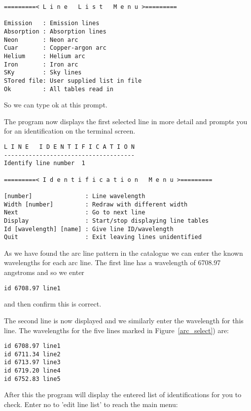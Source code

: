 \documentclass[twoside,11pt]{article}
\newcommand{\scspec}[2]{#1}
\newcommand{\scspec}[2]{#2}
\begin{document}
{\scspec{\small}{ }
\begin{verbatim}
=========< L i n e   L i s t   M e n u >=========

Emission   : Emission lines
Absorption : Absorption lines
Neon       : Neon arc
Cuar       : Copper-argon arc
Helium     : Helium arc
Iron       : Iron arc
SKy        : Sky lines
STored file: User supplied list in file
Ok         : All tables read in
\end{verbatim}
}

So we can type ok at this prompt.

The program now displays the first selected line in more detail and
prompts you for an identification on the terminal screen.

{\scspec{\small}{ }
\begin{verbatim}
L I N E   I D E N T I F I C A T I O N
-------------------------------------
Identify line number  1

=========< I d e n t i f i c a t i o n   M e n u >=========

[number]               : Line wavelength
Width [number]         : Redraw with different width
Next                   : Go to next line
Display                : Start/stop displaying line tables
Id [wavelength] [name] : Give line ID/wavelength
Quit                   : Exit leaving lines unidentified

\end{verbatim}
}

As we have found the arc line pattern in the catalogue we can enter
the known wavelengths for each arc line. The first line has a
wavelength of 6708.97 angstroms and so we enter

{\scspec{\small}{ }
\begin{verbatim}
id 6708.97 line1
\end{verbatim}
}
and then confirm this is correct.

The second line is now displayed and we similarly enter the wavelength
for this line. The wavelengths for the five lines marked in
\scspec{Figure~\ref{arc_select}}{the figure above}) are:

{\scspec{\small}{ }
\begin{verbatim}
id 6708.97 line1
id 6711.34 line2
id 6713.97 line3
id 6719.20 line4
id 6752.83 line5
\end{verbatim}
}

After this the program will display the entered list of
identifications for you to check. Enter no to 'edit line list' to
reach the main menu:
\end{document}
